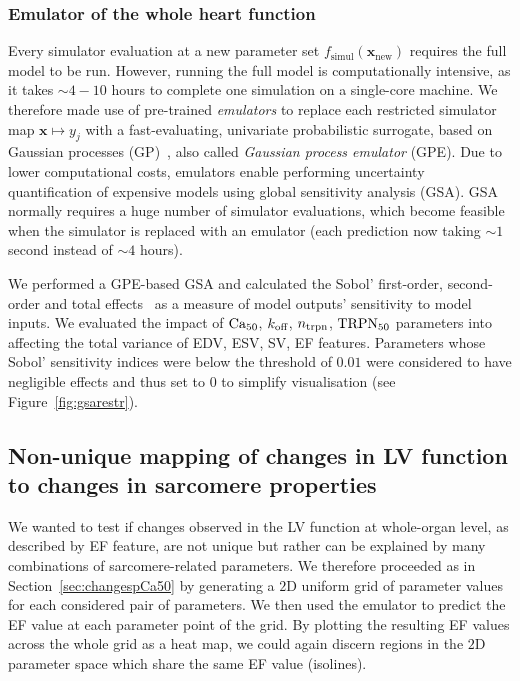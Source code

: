%
%
%
\subsubsection{Emulator of the whole heart function}
Every simulator evaluation at a new parameter set $f_{\textrm{simul}}(\mathbf{x}_{\textrm{new}})$ requires the full model to be run. However, running the full model is computationally intensive, as it takes $\sim 4-10$ hours to complete one simulation on a single-core machine. We therefore made use of pre-trained \textit{emulators} to replace each restricted simulator map $\mathbf{x}\mapsto y_j$ with a fast-evaluating, univariate probabilistic surrogate, based on Gaussian processes (GP)~\cite{Longobardi:2020}, also called \textit{Gaussian process emulator} (GPE). Due to lower computational costs, emulators enable performing uncertainty quantification of expensive models using global sensitivity analysis (GSA). GSA normally requires a huge number of simulator evaluations, which become feasible when the simulator is replaced with an emulator (each prediction now taking $\sim 1$ second instead of $\sim 4$ hours).

\vspace{0.2cm}
We performed a GPE-based GSA and calculated the Sobol' first-order, second-order and total effects~\cite{Sobol:2001} as a measure of model outputs' sensitivity to model inputs. We evaluated the impact of $\textrm{Ca}_{50}$, $k_{\textrm{off}}$, $n_{\textrm{trpn}}$, $\textrm{TRPN}_{50}$ parameters into affecting the total variance of EDV, ESV, SV, EF features. Parameters whose Sobol' sensitivity indices were below the threshold of $0.01$ were considered to have negligible effects and thus set to $0$ to simplify visualisation (see Figure~\ref{fig:gsarestr}).


%
%
%
\subsection{Non-unique mapping of changes in LV function to changes in sarcomere properties}\label{sec:changesLVfunction}
We wanted to test if changes observed in the LV function at whole-organ level, as described by EF feature, are not unique but rather can be explained by many combinations of sarcomere-related parameters. We therefore proceeded as in Section~\ref{sec:changespCa50} by generating a $2$D uniform grid of parameter values for each considered pair of parameters. We then used the emulator to predict the EF value at each parameter point of the grid. By plotting the resulting EF values across the whole grid as a heat map, we could again discern regions in the $2$D parameter space which share the same EF value (isolines).


